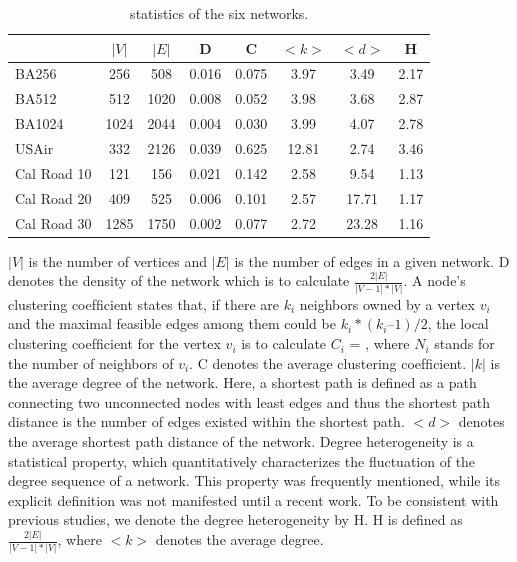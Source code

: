 \documentclass[onecolumn,preprintnumbers,amsmath,amssymb]{revtex4}
\begin{document}

\begin{table}[tbp]
\centering  %
\begin{tabular}{lccccccc}  %
\hline  %
&$|V|$ &$|E|$ &D &C &$<k>$ &$<d>$ &H\\ 
\hline  BA256 &256 &508 &0.016 &0.075 &3.97 &3.49 &2.17 \\  
\hline  BA512 &512 &1020 &0.008 &0.052 &3.98 &3.68 &2.87 \\
\hline  BA1024 &1024 &2044 &0.004 &0.030 &3.99 &4.07 &2.78\\
\hline USAir &332 &2126 &0.039 &0.625 &12.81 &2.74 &3.46\\
\hline Cal Road 10 &121 &156 &0.021 &0.142 &2.58 &9.54 &1.13\\
\hline Cal Road 20 &409 &525 &0.006 &0.101 &2.57 &17.71 &1.17\\
\hline Cal Road 30 &1285 &1750 &0.002 &0.077 &2.72 &23.28 &1.16\\
\hline
\end{tabular}
\caption{statistics of the six networks.}
\end{table}

$|V|$ is the number of vertices and $|E|$ is the number of edges in a given network. D denotes the density of the network which is to calculate $\frac{2|E|}{|V-1|*|V|}$. A node’s clustering coefﬁcient states that, if there are $k_i$ neighbors owned by a vertex $v_i$ and the maximal feasible edges among them could be $k_i*(k_i – 1)/2$, the local clustering coefﬁcient for the vertex $v_i$ is to calculate $C_i$ = \cite{SW}, where $N_i$ stands for the number of neighbors of $v_i$. C denotes the average clustering coefﬁcient. $|k|$ is the average degree of the network. Here, a shortest path is deﬁned as a path connecting two unconnected nodes with least edges and thus the shortest path distance is the number of edges existed within the shortest path. $<d>$ denotes the average shortest path distance of the network. Degree heterogeneity is a statistical property, which quantitatively characterizes the fluctuation of the degree sequence of a network. This property was frequently mentioned, while its explicit definition was not manifested until a recent work\cite{PML}. To be consistent with previous studies, we denote the degree heterogeneity by H. H is defined as $\frac{2|E|}{|V-1|*|V|}$, where $<k>$ denotes the average degree\cite{KD}.
\end{document}
